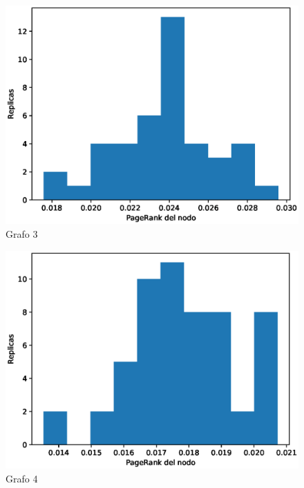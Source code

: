 \documentclass{article}
\begin{document}
\begin{figure}[H]
    \includegraphics[scale=0.6]{hist-excentricidad-3}
    \caption{Grafo 3}
    \label{fig:matriz}
\end{figure}
\begin{figure}[H]
    \includegraphics[scale=0.6]{hist-excentricidad-4}
    \caption{Grafo 4}
    \label{fig:matriz}
\end{figure}
\end{document}
